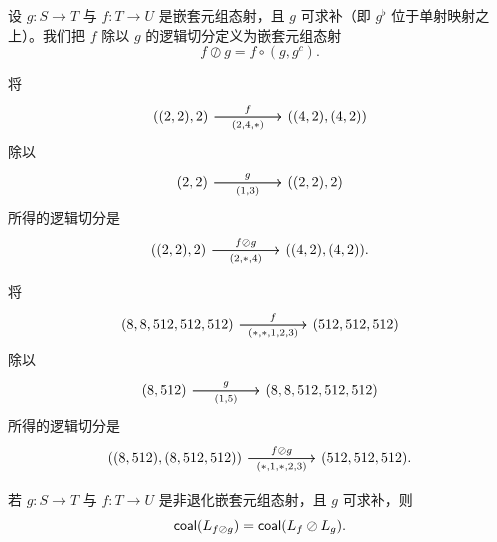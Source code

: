 
\begin{definition}\label{definitionoflogicaldivisionofnestedtuplemorphisms}
    设 $g:S \to T$ 与 $f:T \to U$ 是嵌套元组态射，且 $g$ 可求补（即 $g^\flat$ 位于单射映射之上）。我们把 $f$ 除以 $g$ 的逻辑切分定义为嵌套元组态射
    \[
    f \oslash g = f \circ (g,g^c).
    \]
\end{definition}

\begin{example}
    将
    \[\begin{tikzcd} ((2,2),2) \ar[rr,"f"] \ar[rr,swap,"(2{,}4{,}*)
"] & &  ((4,2),(4,2)) \end{tikzcd} \]
    除以
    \[ \begin{tikzcd} (2,2) \ar[rr,"g"] \ar[rr,swap,"(1{,}3)"] & &  ((2,2),2) \end{tikzcd} \]
    所得的逻辑切分是
    \[ \begin{tikzcd} ((2,2),2) \ar[rr,"f \oslash g"] \ar[rr,swap,"(2{,}*{,}4)"] & &  ((4,2),(4,2)). \end{tikzcd} \]
\end{example}

\begin{example}
    将
    \[\begin{tikzcd} (8,8,512,512,512) \ar[rr,"f"] \ar[rr,swap,"(*{,}*{,}1{,}2{,}3)"] & &  (512,512,512) \end{tikzcd} \]
    除以
    \[ \begin{tikzcd} (8,512) \ar[rr,"g"] \ar[rr,swap,"(1{,}5)"] & &  (8,8,512,512,512) \end{tikzcd} \]
    所得的逻辑切分是
    \[ \begin{tikzcd} ((8,512),(8,512,512)) \ar[rr,"f \oslash g"] \ar[rr,swap,"(*{,}1{,}*{,}2{,}3)"] & &  (512,512,512). \end{tikzcd} \]
\end{example}



\begin{proposition}\label{coalesceoflogicaldivision}
    若 $g:S \to T$ 与 $f:T \to U$ 是非退化嵌套元组态射，且 $g$ 可求补，则
    \[
    \mathsf{coal}(L_{f \oslash g}) = \mathsf{coal}(L_f \oslash L_g).
    \]
\end{proposition}

